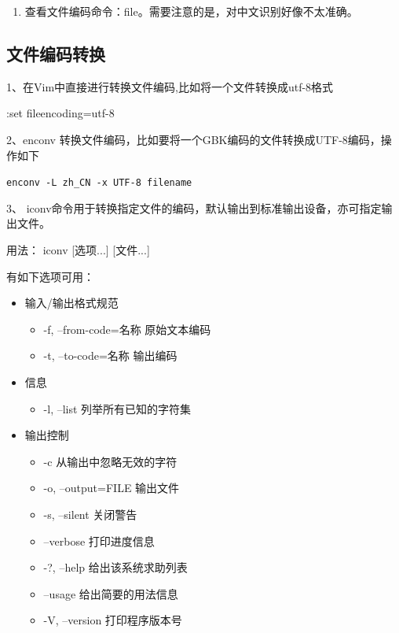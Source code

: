 {\begin{enumerate}
\begin{itemize}
这样，就可以让vim自动识别文件编码（可以自动识别UTF-8或者GBK编码的文件），其实就是依照 fileencodings提供的编码列表尝试，如果没有找到合适的编码，就用latin-1(ASCII)编码打开。
\end{itemize}


\item 查看文件编码命令：file。需要注意的是，对中文识别好像不太准确。
\end{enumerate}



\subsection{文件编码转换}
1、在Vim中直接进行转换文件编码,比如将一个文件转换成utf-8格式

:set fileencoding=utf-8

2、enconv 转换文件编码，比如要将一个GBK编码的文件转换成UTF-8编码，操作如下

\verb|enconv -L zh_CN -x UTF-8 filename|

3、 iconv命令用于转换指定文件的编码，默认输出到标准输出设备，亦可指定输出文件。  

用法： iconv [选项...] [文件...]  

有如下选项可用：
\begin{itemize}
\item 输入/输出格式规范
	\begin{itemize}
	\item  -f, --from-code=名称 原始文本编码  
	\item -t, --to-code=名称 输出编码  
	\end{itemize}
\item 信息
	\begin{itemize}
	\item  -l, --list 列举所有已知的字符集    
	\end{itemize}
\item 输出控制
	\begin{itemize}
	\item  -c 从输出中忽略无效的字符  
	\item -o, --output=FILE 输出文件  
	\item -s, --silent 关闭警告  
	\item --verbose 打印进度信息  
	\item -?, --help 给出该系统求助列表  
	\item --usage 给出简要的用法信息  
	\item -V, --version 打印程序版本号   
	\end{itemize}
\end{itemize}  

}
